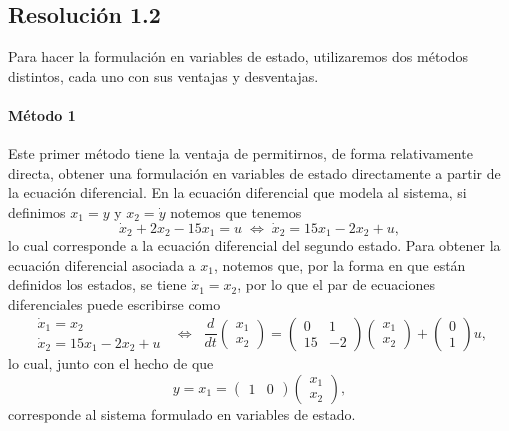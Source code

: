 \documentclass[
  11pt,
  letterpaper,
   addpoints,
   answers
  ]{exam}
\begin{document}
\begin{questions}
\begin{solution}
  \subsection*{Resolución 1.2}
Para hacer la formulación en variables de estado, utilizaremos dos métodos distintos, cada uno con sus ventajas y desventajas.

\paragraph{Método 1}
Este primer método tiene la ventaja de permitirnos, de forma relativamente directa, obtener una formulación en variables de estado directamente a partir de la ecuación diferencial. En la ecuación diferencial que modela al sistema, si definimos $x_1 = y$ y $x_2 = \dot{y}$ notemos que tenemos
\setcounter{equation}{4}
\begin{equation}
\dot{x}_2 + 2x_2 - 15x_1 = u \;\Leftrightarrow\; \dot{x}_2 = 15x_1 - 2x_2 + u,
\end{equation}
lo cual corresponde a la ecuación diferencial del segundo estado. Para obtener la ecuación diferencial asociada a $x_1$, notemos que, por la forma en que están definidos los estados, se tiene $\dot{x}_1 = x_2$, por lo que el par de ecuaciones diferenciales puede escribirse como
\begin{equation}
\begin{gathered}
\dot{x}_1 = x_2 \\
\dot{x}_2 = 15x_1 - 2x_2 + u
\end{gathered}
\;\;\Leftrightarrow\;\;
\frac{d}{dt}\begin{pmatrix} x_1 \\ x_2 \end{pmatrix}
=
\begin{pmatrix} 0 & 1 \\[2pt] 15 & -2 \end{pmatrix}
\begin{pmatrix} x_1 \\ x_2 \end{pmatrix}
+
\begin{pmatrix} 0 \\ 1 \end{pmatrix} u,
\end{equation}
lo cual, junto con el hecho de que
\begin{equation}
y = x_1 = \begin{pmatrix} 1 & 0 \end{pmatrix} \begin{pmatrix} x_1 \\ x_2 \end{pmatrix},
\end{equation}
corresponde al sistema formulado en variables de estado.


\end{solution}
\end{questions}
\end{document}
